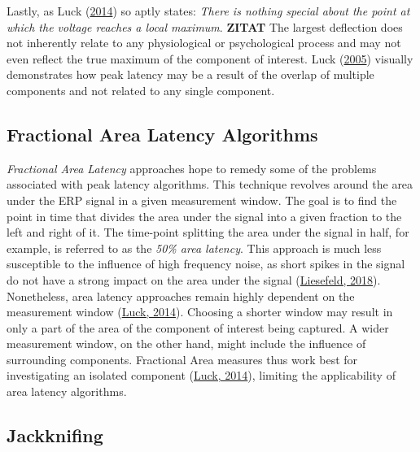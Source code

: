 \documentclass[
  man]{apa7}
\begin{document}
Lastly, as Luck (\protect\hyperlink{ref-luck2014introduction}{2014}) so aptly states: \emph{There is nothing special about the point at which the voltage reaches a local maximum}. \textbf{ZITAT} The largest deflection does not inherently relate to any physiological or psychological process and may not even reflect the true maximum of the component of interest. Luck (\protect\hyperlink{ref-luck2005ten}{2005}) visually demonstrates how peak latency may be a result of the overlap of multiple components and not related to any single component.

\hypertarget{fractional-area-latency-algorithms}{%
\subsection{Fractional Area Latency Algorithms}\label{fractional-area-latency-algorithms}}

\emph{Fractional Area Latency} approaches hope to remedy some of the problems associated with peak latency algorithms. This technique revolves around the area under the ERP signal in a given measurement window. The goal is to find the point in time that divides the area under the signal into a given fraction to the left and right of it. The time-point splitting the area under the signal in half, for example, is referred to as the \emph{50\% area latency}. This approach is much less susceptible to the influence of high frequency noise, as short spikes in the signal do not have a strong impact on the area under the signal (\protect\hyperlink{ref-liesefeld2018estimating}{Liesefeld, 2018}). Nonetheless, area latency approaches remain highly dependent on the measurement window (\protect\hyperlink{ref-luck2014introduction}{Luck, 2014}). Choosing a shorter window may result in only a part of the area of the component of interest being captured. A wider measurement window, on the other hand, might include the influence of surrounding components. Fractional Area measures thus work best for investigating an isolated component (\protect\hyperlink{ref-luck2014introduction}{Luck, 2014}), limiting the applicability of area latency algorithms.

\hypertarget{jackknifing}{%
\subsection{Jackknifing}\label{jackknifing}}
\end{document}

